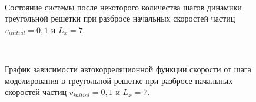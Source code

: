\documentclass[14pt,a4paper,report]{ncc}
\begin{document}
\

\begin{figure}[]
\caption{Состояние системы после некоторого количества шагов динамики треугольной решетки при разбросе начальных скоростей частиц $v_{initial} = 0,1 $ и   $L_x=7$.}
\label{ris:image15}
\end{figure}
\

\begin{figure}[]
\caption{График зависимости автокорреляционной функции скорости от шага моделирования в треугольной решетке при разбросе начальных скоростей частиц $v_{initial} = 0,1 $ и  $L_x=7$.}
\label{ris:image16}
\end{figure}
\
\end{document}
